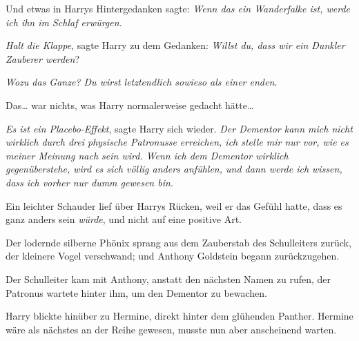 Und etwas in Harrys Hintergedanken sagte: \emph{Wenn das ein Wanderfalke ist, werde ich ihn im Schlaf erwürgen.}

\emph{Halt die Klappe}, sagte Harry zu dem Gedanken: \emph{Willst du, dass wir ein Dunkler Zauberer werden}?

\emph{Wozu das Ganze? Du wirst letztendlich sowieso als einer enden.}

Das… war nichts, was Harry normalerweise gedacht hätte…

\emph{Es ist ein Placebo-Effekt}, sagte Harry sich wieder. \emph{Der Dementor kann mich nicht wirklich durch drei physische Patronusse erreichen, ich stelle mir nur vor, wie es meiner Meinung nach sein wird. Wenn ich dem Dementor wirklich gegenüberstehe, wird es sich völlig anders anfühlen, und dann werde ich wissen, dass ich vorher nur dumm gewesen bin.}

Ein leichter Schauder lief über Harrys Rücken, weil er das Gefühl hatte, dass es ganz anders sein \emph{würde}, und nicht auf eine positive Art.

Der lodernde silberne Phönix sprang aus dem Zauberstab des Schulleiters zurück, der kleinere Vogel verschwand; und Anthony Goldstein begann zurückzugehen.

Der Schulleiter kam mit Anthony, anstatt den nächsten Namen zu rufen, der Patronus wartete hinter ihm, um den Dementor zu bewachen.

Harry blickte hinüber zu Hermine, direkt hinter dem glühenden Panther. Hermine wäre als nächstes an der Reihe gewesen, musste nun aber anscheinend warten.

